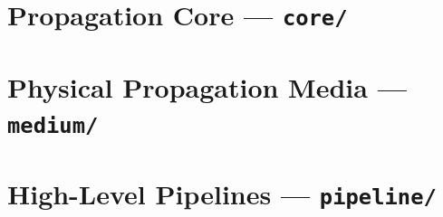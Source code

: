 \documentclass[11pt,a4paper,openany]{report}
\begin{document}
\part{Propagation Core --- \texttt{core/}}






\part{Physical Propagation Media --- \texttt{medium/}}





\part{High-Level Pipelines --- \texttt{pipeline/}}









\clearpage
\printbibliography[title={References}]
\end{document}
